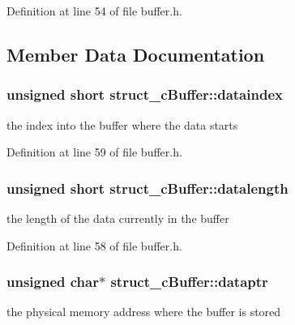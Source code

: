 Definition at line 54 of file buffer.\-h.



\subsection{Member Data Documentation}
\hypertarget{structstruct__c_buffer_a7e8a4fbfa270d36207de44b2ed5e7c8c}{
\subsubsection[{dataindex}]{\setlength{\rightskip}{0pt plus 5cm}unsigned short struct\-\_\-c\-Buffer\-::dataindex}}\label{structstruct__c_buffer_a7e8a4fbfa270d36207de44b2ed5e7c8c}


the index into the buffer where the data starts 



Definition at line 59 of file buffer.\-h.

\hypertarget{structstruct__c_buffer_ace222cd69a1c185a47f0922c4c626bbd}{
\subsubsection[{datalength}]{\setlength{\rightskip}{0pt plus 5cm}unsigned short struct\-\_\-c\-Buffer\-::datalength}}\label{structstruct__c_buffer_ace222cd69a1c185a47f0922c4c626bbd}


the length of the data currently in the buffer 



Definition at line 58 of file buffer.\-h.

\hypertarget{structstruct__c_buffer_ac5d0be464bcb156e014d1f6e5ad63330}{
\subsubsection[{dataptr}]{\setlength{\rightskip}{0pt plus 5cm}unsigned char$\ast$ struct\-\_\-c\-Buffer\-::dataptr}}\label{structstruct__c_buffer_ac5d0be464bcb156e014d1f6e5ad63330}


the physical memory address where the buffer is stored 



